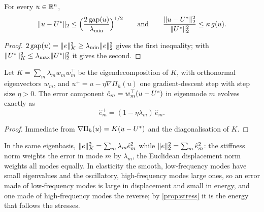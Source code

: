 \begin{lemma}[Conditioning]\label{lem:cond}
For every $u\in\mathbb{R}^{n}$,
\begin{equation}
\lVert u-U^{\ast}\rVert_2 \le \Bigl(\frac{2\operatorname{gap}(u)}{\lambda_{\min}}\Bigr)^{1/2}
\qquad\text{and}\qquad
\frac{\lVert u-U^{\ast}\rVert_2^{2}}{\lVert U^{\ast}\rVert_2^{2}} \le \kappa\, g(u).
\label{eq:cond}
\end{equation}
\end{lemma}

\begin{proof}
$2\operatorname{gap}(u)=\lVert e\rVert_K^2\ge\lambda_{\min}\lVert e\rVert_2^2$ gives the first inequality; with
$\lVert U^{\ast}\rVert_K^2\le\lambda_{\max}\lVert U^{\ast}\rVert_2^2$ it gives the second.
\end{proof}

\begin{corollary}\label{cor:modes}
Let $K=\sum_{m}\lambda_m w_mw_m^{\top}$ be the eigendecomposition of $K$, with orthonormal
eigenvectors $w_m$, and $u^{+}=u-\eta\nabla\Pi_h(u)$ one gradient-descent step with step
size $\eta>0$. The error component $\hat e_m=w_m^{\top}(u-U^{\ast})$ in eigenmode $m$ evolves
exactly as
\begin{equation}
\hat e_m^{+} = (1-\eta\lambda_m)\,\hat e_m .
\label{eq:modes}
\end{equation}
\end{corollary}

\begin{proof}
Immediate from $\nabla\Pi_h(u)=K(u-U^{\ast})$ and the diagonalisation of $K$.
\end{proof}

In the same eigenbasis, $\lVert e\rVert_K^2=\sum_m\lambda_m\hat e_m^2$ while
$\lVert e\rVert_2^2=\sum_m\hat e_m^2$: the stiffness norm weights the error in mode $m$ by
$\lambda_m$, the Euclidean displacement norm weights all modes equally. In elasticity the
smooth, low-frequency modes have small eigenvalues and the oscillatory, high-frequency modes
large ones, so an error made of low-frequency modes is large in displacement and small in
energy, and one made of high-frequency modes the reverse; by \cref{prop:stress} it is the
energy that follows the stresses.

